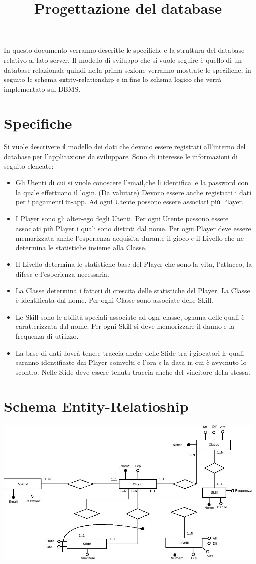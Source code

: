 \documentclass[a4paper,12pt]{article}
\title{Progettazione del database}
\begin{document}
\maketitle

In questo documento verranno descritte le specifiche e la struttura del database relativo al lato server. Il modello di sviluppo che si vuole seguire è quello di un database relazionale quindi nella prima sezione verranno mostrate le specifiche, in seguito lo schema entity-relationship e in fine lo schema logico che verrà implementato sul DBMS. 

\section*{Specifiche}
Si vuole descrivere il modello dei dati che devono essere registrati all'interno del database per l'applicazione da sviluppare. Sono di interesse le informazioni di seguito elencate:
\begin{itemize}
\item Gli Utenti di cui si vuole conoscere l'email,che li identifica, e la password con la quale effettuano il login. (Da valutare) Devono essere anche registrati i dati per i pagamenti in-app. Ad ogni Utente possono essere associati più Player.
\item I Player sono gli alter-ego degli Utenti. Per ogni Utente possono essere associati più Player i quali sono distinti dal nome. Per ogni Player deve essere memorizzata anche l'esperienza acquisita durante il gioco e il Livello che ne determina le statistiche insieme alla Classe.
\item Il Livello determina le statistiche base del Player che sono la vita, l'attacco, la difesa e l'esperienza necessaria.
\item La Classe determina i fattori di crescita delle statistiche del Player. La Classe è identificata dal nome. Per ogni Classe sono associate delle Skill.
\item Le Skill sono le abilità speciali associate ad ogni classe, ognuna delle quali è caratterizzata dal nome. Per ogni Skill si deve memorizzare il danno e la frequenza di utilizzo.
\item La base di dati dovrà tenere traccia anche delle Sfide tra i giocatori le quali saranno identificate dai Player coinvolti e l'ora e la data in cui è avvenuto lo scontro. Nelle Sfide deve essere tenuta traccia anche del vincitore della stessa.
\end{itemize} 
\section*{Schema Entity-Relatioship}
\includegraphics[scale=0.4]{SchemaER.jpeg}
\end{document}

